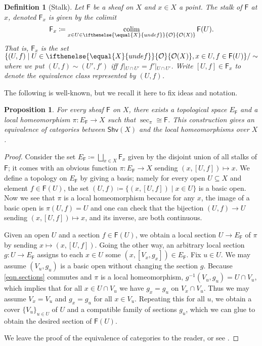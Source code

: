 \documentclass[reqno,11pt]{amsproc}
\theoremstyle{plain}
\newtheorem{proposition}[theorem]{Proposition}
\newtheorem{definition}[theorem]{Definition}
\theoremstyle{definition}
\DeclareMathOperator*{\colim}{colim}
\newcommand{\cat}[1]{\mathsf{#1}}
\newcommand{\fun}[1]{\mathsf{#1}}
\newcommand{\sheaf}[1]{\fun{#1}}
\renewcommand{\to}[1][]{\xrightarrow{#1}}
\newcommand{\shv}{\cat{Shv}}
\newcommand{\Op}[1][undef]{\ifthenelse{\equal{#1}{undef}}{\mathcal{O}}{\mathcal{O}(#1)}}
\newcommand{\rest}[2]{#1\big|\hspace{0in}_{#2}}
\numberwithin{equation}{section}
\begin{document}
\begin{definition}[Stalk]
Let $\sheaf{F}$ be a sheaf on $X$ and $x\in X$ a point. The \emph{stalk of $\sheaf{F}$ at $x$}, denoted $\sheaf{F}_x$ is given by the colimit
\[\sheaf{F}_x\coloneqq\colim_{x\in U\in\Op[X]}\sheaf{F}(U).\]
That is, $\sheaf{F}_x$ is the set $\{(U,f)\mid U\in\Op[X], x\in U, f\in \sheaf{F}(U)\}/\sim$ where we put $(U,f)\sim (U',f')$ iff $\rest{f}{U\cap U'}=\rest{f'}{U\cap U'}$. Write $[U,f]\in \sheaf{F}_x$ to denote the equivalence class represented by $(U,f)$.
\end{definition}

The following is well-known, but we recall it here to fix ideas and notation.

\begin{proposition}\label{prop.local_homeo}
For every sheaf $\sheaf{F}$ on $X$, there exists a topological space $E_\sheaf{F}$ and a local homeomorphism $\pi\colon E_\sheaf{F}\to X$ such that $\sec_\pi\cong\sheaf{F}$. This construction gives an equivalence of categories between $\shv(X)$ and the local homeomorphisms over $X$.
\end{proposition}
\begin{proof}
Consider the set $E_\sheaf{F}\coloneqq\bigsqcup_{x\in X}\sheaf{F}_x$ given by the disjoint union of all stalks of $\sheaf{F}$; it comes with an obvious function $\pi\colon E_\sheaf{F}\to X$ sending $(x,[U,f])\mapsto x$. We define a topology on $E_\sheaf{F}$ by giving a basis; namely for every open $U\subseteq X$ and element $f\in\sheaf{F}(U)$, the set $(U,f)\coloneqq\{(x,[U,f])\mid x\in U\}$ is a basic open. Now we see that $\pi$ is a local homeomorphism because for any $x$, the image of a basic open is $\pi(U,f)=U$ and one can check that the bijection $(U,f)\to U$ sending $(x,[U,f])\mapsto x$, and its inverse, are both continuous.

Given an open $U$ and a section $f\in\sheaf{F}(U)$, we obtain a local section $U\to E_\sheaf{F}$ of $\pi$ by sending $x\mapsto (x,[U,f])$. Going the other way, an arbitrary local section $g\colon U\to E_\sheaf{F}$ assigns to each $x\in U$ some $(x,[V_x,g_x])\in E_\sheaf{F}$. Fix $u\in U$. We may assume $(V_u,g_u)$ is a basic open without changing the section $g$. Because \eqref{eqn.sections} commutes and $\pi$ is a local homeomorphism, $g^{-1}(V_u,g_u)=U\cap V_u$, which implies that for all $x\in U\cap V_u$ we have $g_{x}=g_u$ on $V_x\cap V_u$. Thus we may assume $V_x=V_u$ and $g_x=g_u$ for all $x\in V_u$. Repeating this for all $u$, we obtain a cover $\{V_u\}_{u\in U}$ of $U$ and a compatible family of sections $g_u$, which we can glue to obtain the desired section of $\sheaf{F}(U)$.

We leave the proof of the equivalence of categories to the reader, or see \cite[Corollary 2.6.3]{MacLane.Moerdijk:1992a}.
\end{proof}
\end{document}
